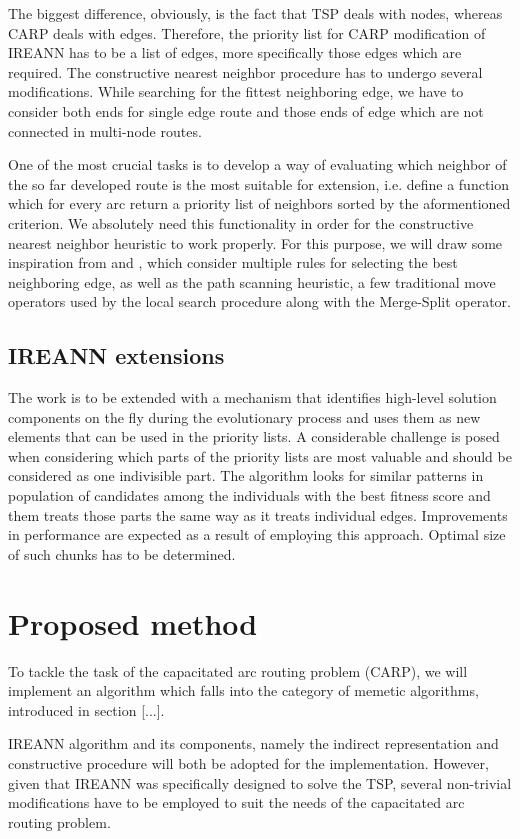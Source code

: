 \documentclass[twoside]{ctuthesis}
\theoremstyle{plain}
\theoremstyle{definition}
\theoremstyle{note}
\begin{document}
The biggest difference, obviously, is the fact that TSP deals with nodes, whereas CARP deals with edges. Therefore, the priority list for CARP modification of IREANN has to be a list of edges, more specifically those edges which are required. The constructive nearest neighbor procedure has to undergo several modifications. While searching for the fittest neighboring edge, we have to consider both ends for single edge route and those ends of edge which are not connected in multi-node routes.

One of the most crucial tasks is to develop a way of evaluating which neighbor of the so far developed route is the most suitable for extension, i.e. define a function which for every arc return a priority list of neighbors sorted by the aformentioned criterion. We absolutely need this functionality in order for the constructive nearest neighbor heuristic to work properly. For this purpose, we will draw some inspiration from \cite{5200351} and \cite{ULUSOY1985329}, which consider multiple rules for selecting the best neighboring edge, as well as the path scanning heuristic, a few traditional move operators used by the local search procedure along with the Merge-Split operator.

\section{IREANN extensions}
The work is to be extended with a mechanism that identifies high-level solution components on the fly during the evolutionary process and uses them as new elements that can be used in the priority lists. A considerable challenge is posed when considering which parts of the priority lists are most valuable and should be considered as one indivisible part. The algorithm looks for similar patterns in population of candidates among the individuals with the best fitness score and them treats those parts the same way as it treats individual edges. Improvements in performance are expected as a result of employing this approach. Optimal size of such chunks has to be determined.

\chapter{Proposed method}
To tackle the task of the capacitated arc routing problem (CARP), we will implement an algorithm which falls into the category of memetic algorithms, introduced in section [...]. 

IREANN algorithm and its components, namely the indirect representation and constructive procedure will both be adopted for the implementation. However, given that IREANN was specifically designed to solve the TSP, several non-trivial modifications have to be employed to suit the needs of the capacitated arc routing problem.
\end{document}
